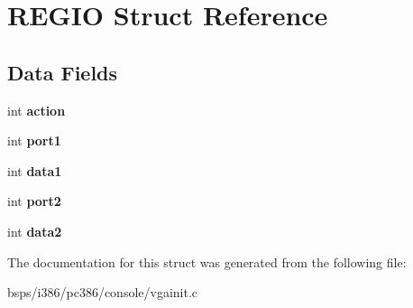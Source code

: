 \hypertarget{structREGIO}{}\section{R\+E\+G\+IO Struct Reference}
\label{structREGIO}
\subsection*{Data Fields}
\begin{DoxyCompactItemize}
\item 
\mbox{\label{structREGIO_a9cca615bc7b4e2344dfa58957e8e1e2a}} 
int {\bfseries action}
\item 
\mbox{\label{structREGIO_a2ff9ea101767e6ebe802c3f2f59aec68}} 
int {\bfseries port1}
\item 
\mbox{\label{structREGIO_a56f72ea90ab1f2e4806566b1706bf83a}} 
int {\bfseries data1}
\item 
\mbox{\label{structREGIO_a55af2261f62f95fb51c167276790c44c}} 
int {\bfseries port2}
\item 
\mbox{\label{structREGIO_a5c2b63c28b76fda814ce67d937b33698}} 
int {\bfseries data2}
\end{DoxyCompactItemize}


The documentation for this struct was generated from the following file\+:\begin{DoxyCompactItemize}
\item 
bsps/i386/pc386/console/vgainit.\+c\end{DoxyCompactItemize}

